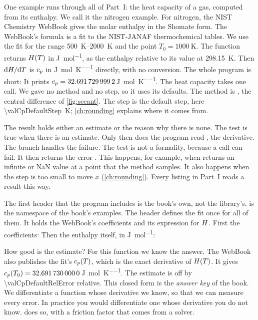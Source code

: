 One example runs through all of Part~I: the heat capacity of a gas, computed from its enthalpy. We call it the
nitrogen example. For nitrogen, the NIST Chemistry WebBook gives the molar enthalpy in the Shomate
form. The WebBook's formula is a fit to the NIST-JANAF thermochemical
tables.\cite{nist-webbook,chase1998} We use the fit for the range \SIrange{500}{2000}{\kelvin} and the point
$T_0 = \SI{1000}{\kelvin}$. The function returns $H(T)$ in \si{\joule\per\mole}, as the enthalpy relative to its
value at \SI{298.15}{\kelvin}. Then $\mathrm{d} H / \mathrm{d} T$ is $c_p$ in \si{\joule\per\mole\per\kelvin} directly, with no
conversion. The whole program is short:
It prints $c_p = \num{32.6917299992}$\,\si{\joule\per\mole\per\kelvin}. The heat capacity takes one call.
We gave  no method and no step, so it uses its defaults. The method is , the
central difference of \cref{fig:secant}. The step is the default step, here \SI{\valCpDefaultStep}{\kelvin};
\cref{ch:rounding} explains where it comes from.

The result  holds either an estimate or the reason why there is none. The test  is true when
there is an estimate. Only then does the program read , the derivative. The  branch handles
the failure. The test is not a formality, because a call can fail. It then returns the error
. This happens, for example, when  returns an infinite or NaN
value at a
point that the method samples. It also happens when the step is too small to move $x$ (\cref{ch:rounding}). Every
listing in Part~I reads a result this way.

The first header that the program includes is the book's own, not the library's.  is the namespace of
the book's examples. The header  defines the fit once for all of them. It holds the WebBook's
coefficients and its expression for $H$. First the coefficients:
Then the enthalpy itself, in \si{\joule\per\mole}:

How good is the estimate? For this function we know the answer. The WebBook also publishes the fit's $c_p(T)$,
which is the exact derivative of $H(T)$. It gives $c_p(T_0) = \num{32.6917300000}$\,\si{\joule\per\mole\per\kelvin}.
The estimate is off by \num{\valCpDefaultRelError} relative. This closed form is the \emph{answer key} of the book. We differentiate
a function whose derivative we know, so that we can measure every error. In practice you would differentiate one
whose derivative you do not know.  does so, with a friction factor that comes from a solver.

